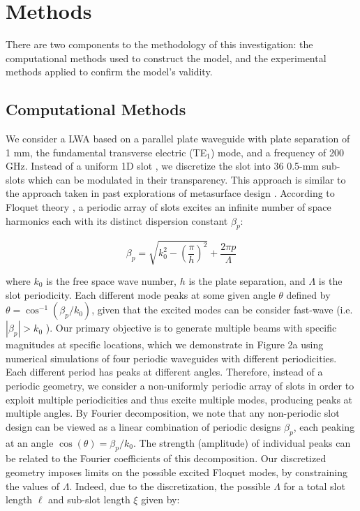\documentclass[11pt]{article}
\begin{document}
\section*{Methods}

There are two components to the methodology of this investigation: the computational methods used to construct the model, and the experimental methods applied to confirm the model's validity.

\subsection*{Computational Methods}

We consider a LWA based on a parallel plate waveguide with plate separation of 1 mm, the fundamental transverse electric (TE$_1$) mode, and a frequency of 200 GHz. Instead of a uniform 1D slot \cite{doi:10.1063/5.0033126}, we discretize the slot into 36 0.5-mm sub-slots which can be modulated in their transparency. This approach is similar to the approach taken in past explorations of metasurface design \cite{Liu:2022tg, Jafar-Zanjani:2018vy}. According to Floquet theory \cite{6556051}, a periodic array of slots excites an infinite number of space harmonics each with its distinct dispersion constant $\beta_p$:

\[\beta_p=\sqrt{k_0^2 - (\frac{\pi}{h})^2} +\frac{2\pi p}{\Lambda} \tag{1}\] 


\noindent where $k_0$ is the free space wave number, $h$ is the plate separation, and $\Lambda$ is the slot periodicity. Each different mode peaks at some given angle $\theta$ defined by $\theta=\cos^{-1}(\beta_p/k_0)$, given that the excited modes can be consider fast-wave (i.e. $|\beta_p|>k_0$ ). Our primary objective is to generate multiple beams with specific magnitudes at specific locations, which we demonstrate in Figure 2a using numerical simulations of four periodic waveguides with different periodicities. Each different period has peaks at different angles. Therefore, instead of a periodic geometry, we consider a non-uniformly periodic array of slots in order to exploit multiple periodicities and thus excite multiple modes, producing peaks at multiple angles. By Fourier decomposition, we note that any non-periodic slot design can be viewed as a linear combination of periodic designs $\beta_p$, each peaking at an angle $\cos(\theta)=\beta_p/k_0$. The strength (amplitude) of individual peaks can be related to the Fourier coefficients of this decomposition. Our discretized geometry imposes limits on the possible excited Floquet modes, by constraining the values of $\Lambda$. Indeed, due to the discretization, the possible $\Lambda$ for a total slot length $\ell$ and sub-slot length $\xi$ given by:
\end{document}
